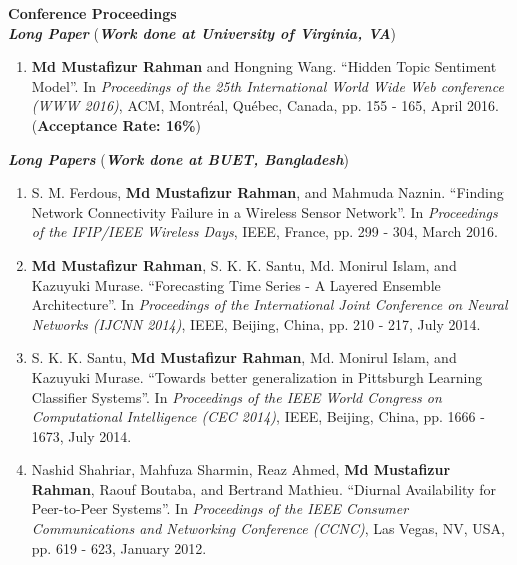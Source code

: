 \documentclass[11pt]{res}
\begin{document}
\begin{resume}
\begin{enumerate}
\end{enumerate}

{\large \bf Conference Proceedings}\\
\vspace{2pt}
\noindent\textbf{\textit{Long Paper}} ({\sl \textbf{Work done at University of Virginia, VA}})
\begin{enumerate} \itemsep -2pt

    
    \item {\bf Md Mustafizur Rahman} and Hongning Wang. ``Hidden Topic Sentiment Model''. In {\it Proceedings of the 25th International World Wide Web conference (WWW 2016)}, ACM, Montréal, Québec, Canada, pp. 155 - 165, April 2016. (\textbf{Acceptance Rate: 16\%}) %
\end{enumerate}
\textbf{\textit{Long Papers}} ({\sl \textbf{Work done at BUET, Bangladesh}})
  
\begin{enumerate}

    \item S. M. Ferdous, {\bf Md Mustafizur Rahman}, and Mahmuda Naznin. ``Finding Network Connectivity Failure in a Wireless Sensor Network''. In {\it Proceedings of the IFIP/IEEE Wireless Days}, IEEE, France, pp. 299 - 304, March 2016. %
    
    \item {\bf Md Mustafizur Rahman}, S. K. K. Santu, Md. Monirul Islam, and Kazuyuki Murase. ``Forecasting Time Series - A Layered Ensemble Architecture''. In {\it Proceedings of the International Joint Conference on Neural Networks (IJCNN 2014)}, IEEE, Beijing, China, pp. 210 - 217, July 2014. %
    
    \item S. K. K. Santu, {\bf Md Mustafizur Rahman}, Md. Monirul Islam, and Kazuyuki Murase. ``Towards better generalization in Pittsburgh Learning Classifier Systems''. In {\it Proceedings of the IEEE World Congress on Computational Intelligence (CEC 2014)}, IEEE, Beijing, China, pp. 1666 - 1673, July 2014. %
    
    \item Nashid Shahriar, Mahfuza Sharmin, Reaz Ahmed, {\bf Md Mustafizur
    Rahman}, Raouf  Boutaba, and  Bertrand  Mathieu. ``Diurnal Availability for Peer-to-Peer
    Systems''. In {\it Proceedings of the IEEE Consumer Communications and Networking Conference (CCNC)}, Las Vegas, NV, USA, pp. 619 - 623, January 2012. %


\end{enumerate}
\end{resume}
\end{document}
